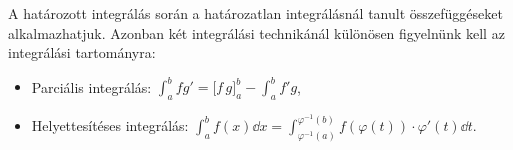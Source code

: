 \documentclass[a4paper, 12pt]{scrartcl}
\begin{document}
\begin{note}
  A határozott integrálás során a határozatlan integrálásnál tanult
  összefüggéseket alkalmazhatjuk. Azonban két integrálási technikánál különösen
  figyelnünk kell az integrálási tartományra:
  \begin{itemize}
    \item Parciális integrálás: $\displaystyle
            \int_a^b f g' = \Big[ f \, g \Big]_a^b - \int_a^b f' g
          $,

    \item Helyettesítéses integrálás: $\displaystyle
            \int_a^b f(x) \dd x = \int_{\varphi^{-1}(a)}^{\varphi^{-1}(b)} f(\varphi(t)) \cdot  \varphi'(t) \dd t
          $.
  \end{itemize}
\end{note}
\end{document}

